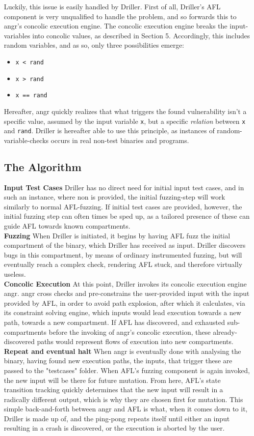 \documentclass[a4paper]{article}
\newcommand{\tbf}[1]{\textbf{#1}}
\newcommand{\tit}[1]{\textit{#1}}
\newcommand{\ttt}[1]{\texttt{#1}}
\newcommand{\subsubsubsection}[1]{\tbf{#1}}
\begin{document}
Luckily, this issue is easily handled by Driller. First of all, Driller's AFL component is very unqualified to handle the problem, and so forwards this to angr's concolic execution engine. The concolic execution engine breaks the input-variables into concolic values, as described in Section 5. Accordingly, this includes random variables, and as so, only three possibilities emerge:
\begin{itemize}[noitemsep]
	\item \ttt{x < rand}
	\item \ttt{x > rand}
	\item \ttt{x == rand}
\end{itemize}
Hereafter, angr quickly realizes that what triggers the found vulnerability isn't a specific value, assumed by the input variable \ttt{x}, but a specific \tit{relation} between \ttt{x} and \ttt{rand}. Driller is hereafter able to use this principle, as instances of random-variable-checks occurs in real non-test binaries and programs.
\subsection{The Algorithm}
\label{sec:TheAlgorithm}
\subsubsubsection{Input Test Cases}
Driller has no direct need for initial input test cases, and in such an instance, where non is provided, the initial fuzzing-step will work similarly to normal AFL-fuzzing. If initial test cases are provided, however, the initial fuzzing step can often times be sped up, as a tailored presence of these can guide AFL towards known compartments.\\
\subsubsubsection{Fuzzing}
When Driller is initiated, it begins by having AFL fuzz the initial compartment of the binary, which Driller has received as input. Driller discovers bugs in this compartment, by means of ordinary instrumented fuzzing, but will eventually reach a complex check, rendering AFL stuck, and therefore virtually useless.\\
\subsubsubsection{Concolic Execution}
At this point, Driller invokes its concolic execution engine angr. angr cross checks and pre-constrains the user-provided input with the input provided by AFL, in order to avoid path explosion, after which it calculates, via its constraint solving engine, which inputs would lead execution towards a new path, towards a new compartment. If AFL has discovered, and exhausted sub-compartments before the invoking of angr's concolic execution, these already-discovered paths would represent flows of execution into new compartments.\\
\subsubsubsection{Repeat and eventual halt}
When angr is eventually done with analysing the binary, having found new execution paths, the inputs, that trigger these are passed to the "testcases" folder. When AFL's fuzzing component is again invoked, the new input will be there for future mutation. From here, AFL's state transition tracking quickly determines that the new input will result in a radically different output, which is why they are chosen first for mutation. This simple back-and-forth between angr and AFL is what, when it comes down to it, Driller is made up of, and the ping-pong repeats itself until either an input resulting in a crash is discovered, or the execution is aborted by the user. 
\end{document}
